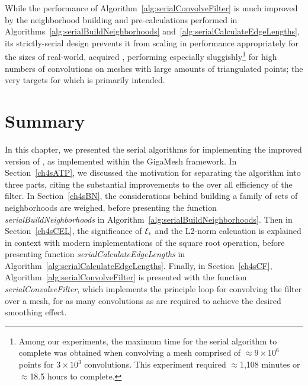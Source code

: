 %
%

While the performance of Algorithm~\ref{alg:serialConvolveFilter} is much improved by the neighborhood building and pre-calculations performed in Algorithms~\ref{alg:serialBuildNeighborhoods} and~\ref{alg:serialCalculateEdgeLengths}, its strictly-serial design prevents it from scaling in performance appropriately for the sizes of real-world, acquired \tdd{}, performing especially sluggishly\footnote{Among our experiments, the maximum time for the serial algorithm to complete was obtained when convolving a mesh comprised of $\approx$$9\times 10^6$ points for $3\times 10^3$ convolutions. This experiment required $\approx$1,108 minutes or $\approx$18.5 hours to complete.} for high numbers of convolutions on meshes with large amounts of triangulated points; the very targets for which  is primarily intended.

%
%
%
%
\section{Summary}
\label{ch4sDN}
In this chapter, we presented the serial algorithms for implementing the improved version of , as implemented within the GigaMesh framework. In Section~\ref{ch4sATP}, we discussed the motivation for separating the algorithm into three parts, citing the substantial improvements to the over all efficiency of the filter. In Section~\ref{ch4sBN}, the considerations behind building a family of sets of neighborhoods are weighed, before presenting the function \textit{serialBuildNeighborhoods} in Algorithm~\ref{alg:serialBuildNeighborhoods}. Then in Section~\ref{ch4sCEL}, the significance of $\ell_\ast$ and the L2-norm calcuation is explained in context with modern implementations of the square root operation, before presenting function \textit{serialCalculateEdgeLengths} in Algorithm~\ref{alg:serialCalculateEdgeLengths}. Finally, in Section~\ref{ch4sCF}, Algorithm~\ref{alg:serialConvolveFilter} is presented with the function \textit{serialConvolveFilter}, which implements the principle loop for convolving the filter over a mesh, for as many convolutions as are required to achieve the desired smoothing effect.


